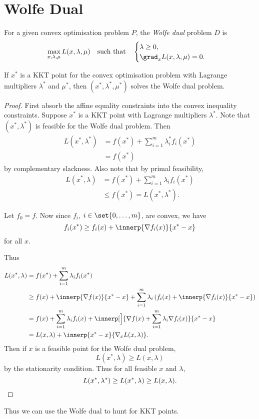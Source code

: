 \section{Wolfe Dual} \label{sec:wolfe_dual}
\begin{definition*} \label{def:wolfe_dual}
    For a given convex optimisation problem $P$, the \emph{Wolfe dual}
    problem $D$ is \[
        \max_{x, \lambda, \mu} L(x, \lambda, \mu) \quad \text{such that}
        \quad \begin{cases}
            \lambda \ge 0, \\
            \grad_x L(x, \lambda, \mu) = 0.
        \end{cases}
    \]
\end{definition*}
\begin{theorem*}
    If $x^*$ is a KKT point for the convex optimisation problem with
    Lagrange multipliers $\lambda^*$ and $\mu^*$, then
    $(x^*, \lambda^*, \mu^*)$ solves the Wolfe dual problem.
\end{theorem*}
\begin{proof}
    First absorb the affine equality constraints into the convex
    inequality constraints.
    Suppose $x^*$ is a KKT point with Lagrange multipliers
    $\lambda^*$.
    Note that $(x^*, \lambda^*)$ is feasible for the Wolfe dual
    problem.
    Then \begin{align*}
        L(x^*, \lambda^*) &= f(x^*) + \sum_{i=1}^{m} \lambda_i^* f_i(x^*) \\
                    &= f(x^*)
    \end{align*} by complementary slackness.
    Also note that by primal feasibility, \begin{align*}
        L(x^*, \lambda) &= f(x^*) + \sum_{i=1}^{m} \lambda_i f_i(x^*) \\
                  &\le f(x^*) = L(x^*, \lambda^*).
    \end{align*}

    Let $f_0 = f$.
    Now since $f_i$, $i \in \set{0, \dots, m}$, are convex, we have \[
        f_i(x^*) \ge f_i(x) + \innerp{\nabla f_i(x)}{x^* - x}
    \] for all $x$.

    Thus \begin{align*}
        L(x^*, \lambda)
            &= f(x^*) + \sum_{i=1}^{m} \lambda_i f_i(x^*) \\
            &\ge f(x) + \innerp{\nabla f(x)}{x^* - x}
                + \sum_{i=1}^{m} \lambda_i \left(f_i(x)
                            + \innerp{\nabla f_i(x)}{x^* - x}\right) \\
            &= f(x) + \sum_{i=1}^{m} \lambda_i f_i(x)
                + \innerp[\Big]{\nabla f(x)
                    + \sum_{i=1}^{m} \lambda_i \nabla f_i(x)}{x^* - x} \\
            &= L(x, \lambda) + \innerp{x^* - x}{\nabla_x L(x, \lambda)}.
    \end{align*}
    Then if $x$ is a feasible point for the Wolfe dual problem, \[
        L(x^*, \lambda) \ge L(x, \lambda)
    \] by the stationarity condition.
    Thus for all feasible $x$ and $\lambda$, \[
        L(x^*, \lambda^*) \ge L(x^*, \lambda) \ge L(x, \lambda). \qedhere
    \]
\end{proof}
Thus we can use the Wolfe dual to hunt for KKT points.
